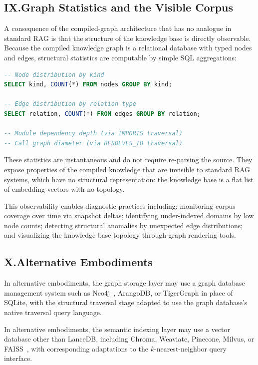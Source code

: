 \documentclass[12pt]{article}
\begin{document}
\subsection{IX.\quad Graph Statistics and the Visible Corpus}

A consequence of the compiled-graph architecture that has no analogue in standard
RAG is that the structure of the knowledge base is directly observable. Because
the compiled knowledge graph is a relational database with typed nodes and edges,
structural statistics are computable by simple SQL aggregations:

\begin{lstlisting}[language=SQL, caption={Representative SQL statistics queries over the compiled knowledge graph.}]
-- Node distribution by kind
SELECT kind, COUNT(*) FROM nodes GROUP BY kind;

-- Edge distribution by relation type
SELECT relation, COUNT(*) FROM edges GROUP BY relation;

-- Module dependency depth (via IMPORTS traversal)
-- Call graph diameter (via RESOLVES_TO traversal)
\end{lstlisting}

These statistics are instantaneous and do not require re-parsing the source. They
expose properties of the compiled knowledge that are invisible to standard RAG
systems, which have no structural representation: the knowledge base is a flat
list of embedding vectors with no topology.

This observability enables diagnostic practices including: monitoring corpus
coverage over time via snapshot deltas; identifying under-indexed domains by low
node counts; detecting structural anomalies by unexpected edge distributions; and
visualizing the knowledge base topology through graph rendering tools.

\subsection{X.\quad Alternative Embodiments}

In alternative embodiments, the graph storage layer may use a graph database
management system such as Neo4j~\cite{neo4j}, ArangoDB, or TigerGraph in place
of SQLite, with the structural traversal stage adapted to use the graph
database's native traversal query language.

In alternative embodiments, the semantic indexing layer may use a vector database
other than LanceDB, including Chroma, Weaviate, Pinecone, Milvus, or
FAISS~\cite{johnson2021faiss}, with corresponding adaptations to the
$k$-nearest-neighbor query interface.
\end{document}
